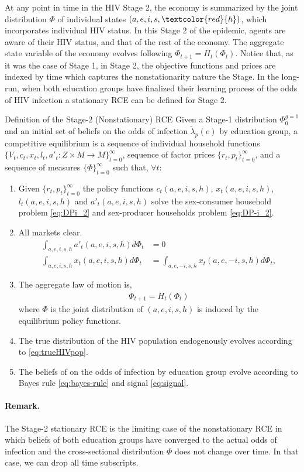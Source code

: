 At any point in time in the HIV Stage 2, the economy is summarized by the joint distribution $\Phi$ of individual states $(a,e,i,s,\textcolor{red}{h})$, which incorporates individual HIV status. In this Stage 2 of the epidemic, agents are aware of their HIV status, and that of the rest of the economy. The aggregate state variable of the economy evolves following $\Phi_{t+1} = H_t (\Phi_t)$. Notice that, as it was the case of Stage 1, in Stage 2, the objective functions and prices are indexed by time which captures the nonstationarity nature the Stage. In the long-run, when both education groups have finalized their learning process of the odds of HIV infection a stationary RCE can be defined for Stage 2. 

\begin{myexampleblock}{Definition of the Stage-2 (Nonstationary) RCE}
Given a Stage-1 distribution $\Phi^{g=1}_{0}$ and an initial set of beliefs on the odds of infection $\widetilde{\lambda}_p(e)$ by education group, a competitive equilibrium is a sequence of individual household functions $\{V_t,c_t,x_t,l_t,a'_{t}: Z \times M \rightarrow M\}_{t=0}^\infty$, sequence of factor prices $\{r_t,p_t\}_{t=0}^\infty$, and a sequence of measures $\{\Phi\}_{t=0}^\infty$ such that, $\forall t$:
\begin{enumerate}
    \item Given $\{r_t,p_t\}_{t=0}^\infty$ the policy functions $c_t(a,e,i,s,h)$, $x_t(a,e,i,s,h)$, $l_t(a,e,i,s,h)$ and $a'_t(a,e,i,s,h)$ solve the sex-consumer household problem \eqref{eq:DPi_2} and sex-producer households problem \eqref{eq:DP-i_2}.
\item All markets clear.
 \begin{align*}
\int_{a,e,i,s,h} a'_t(a,e,i,s,h) d\Phi_t &= 0 \\
\int_{a,e,i,s,h} x_t(a,e,i,s,h) d \Phi_t &= \int_{a,e,-i,s,h} x_t(a,e,-i,s,h) d\Phi_t,
\end{align*}
\item The aggregate law of motion is,
 \begin{align*}
     \Phi_{t+1} = H_t(\Phi_t)
 \end{align*}
 where $\Phi$ is the joint distribution of $(a,e,i,s,h)$ is induced by the equilibrium policy functions.
 \item The true distribution of the HIV population endogenously evolves according to \eqref{eq:trueHIVpop}.
 
 \item The beliefs of on the odds of infection by education group evolve according to Bayes rule \eqref{eq:bayes-rule} and signal \eqref{eq:signal}.
 \end{enumerate}
 
\paragraph{Remark.} The Stage-2 stationary RCE is the limiting case of the nonstationary RCE in which beliefs of both education groups have converged to the actual odds of infection and the cross-sectional distribution $\Phi$ does not change over time. In that case, we can drop all time subscripts.
 
\end{myexampleblock}


